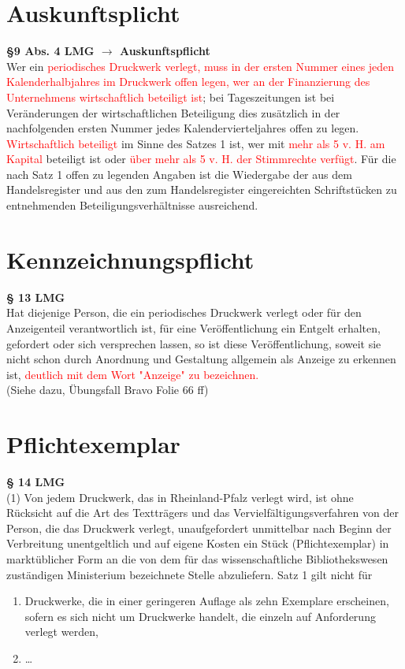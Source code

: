 \section{Auskunftsplicht}
\textbf{§9 Abs. 4 LMG $\rightarrow$ Auskunftspflicht}\\
Wer ein \textcolor{red}{periodisches Druckwerk verlegt, muss in der ersten Nummer eines jeden Kalenderhalbjahres im Druckwerk offen legen, wer an der Finanzierung des Unternehmens wirtschaftlich beteiligt ist}; bei Tageszeitungen ist bei Veränderungen der wirtschaftlichen Beteiligung dies zusätzlich in der nachfolgenden ersten Nummer jedes Kalendervierteljahres offen zu legen. \textcolor{red}{Wirtschaftlich beteiligt} im Sinne des Satzes 1 ist, wer mit \textcolor{red}{mehr als 5 v. H. am Kapital} beteiligt ist oder \textcolor{red}{über mehr als 5 v. H. der  Stimmrechte verfügt}. Für die nach Satz 1 offen zu legenden Angaben ist die Wiedergabe der aus dem Handelsregister und aus den zum Handelsregister eingereichten Schriftstücken zu entnehmenden Beteiligungsverhältnisse ausreichend.
%
%
%
\section{Kennzeichnungspflicht}
\textbf{§ 13 LMG}\\
Hat diejenige Person, die ein periodisches Druckwerk verlegt oder für den Anzeigenteil verantwortlich ist, für eine Veröffentlichung ein Entgelt erhalten, gefordert oder sich versprechen lassen, so ist diese Veröffentlichung, soweit sie nicht schon durch Anordnung und Gestaltung allgemein als Anzeige zu erkennen ist, \textcolor{red}{deutlich mit dem Wort "Anzeige" zu bezeichnen.} \\
(Siehe dazu, Übungsfall Bravo Folie 66 ff)
%
%
%
\section{Pflichtexemplar}
\textbf{§ 14 LMG}\\
(1) Von jedem Druckwerk, das in Rheinland-Pfalz verlegt wird, ist ohne Rücksicht auf die Art des Textträgers und das Vervielfältigungsverfahren von der Person, die das Druckwerk verlegt, unaufgefordert unmittelbar nach Beginn der Verbreitung unentgeltlich und auf eigene Kosten ein Stück (Pflichtexemplar) in marktüblicher Form an die von dem für das wissenschaftliche Bibliothekswesen zuständigen Ministerium bezeichnete Stelle abzuliefern. Satz 1 gilt nicht für
\begin{enumerate}
\item Druckwerke, die in einer geringeren Auflage als zehn Exemplare erscheinen, sofern es sich nicht um Druckwerke handelt, die einzeln auf Anforderung verlegt werden,
\item \lbrack \dots \rbrack
\end{enumerate}
%
%
%
